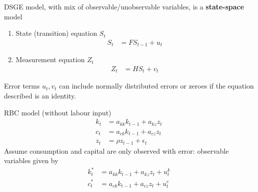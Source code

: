 \documentclass{beamer}
\begin{document}
\begin{frame}
  DSGE model, with mix of observable/unobservable variables, is a \textbf{state-space} model
\begin{enumerate}
  \item State (transition) equation $S_t$
  \begin{align*}
    S_t &= FS_{t-1} + u_t
  \end{align*}
  \item Measurement equation $Z_t$
  \begin{align*}
    Z_t &= HS_t+v_t
  \end{align*}
\end{enumerate} 
 \medskip
Error terms $u_t,v_t$ can include normally distributed errors or zeroes if the equation described is an identity.
\end{frame}

\begin{frame}
 RBC model (without labour input)  
\begin{align}
  k_t &= a_{kk}k_{t-1} + a_{kz}z_t\\
  c_t &= a_{ck}k_{t-1} + a_{cz}z_t\\
  z_t &= \rho z_{t-1} + \epsilon_t
\end{align}
\medskip
Assume consumption and capital are only observed with error: observable variables given by
\begin{align}
  k_t^* &= a_{kk}k_{t-1} + a_{kz}z_t + u_t^k\\
  c_t^* &= a_{ck}k_{t-1} + a_{cz}z_t + u_t^c  
\end{align}
\end{frame}
\end{document}

